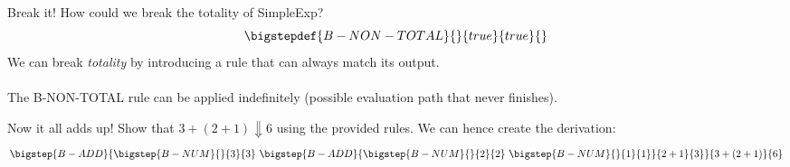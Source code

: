 \begin{examplebox}{Break it!}
    How could we break the totality of SimpleExp?
    \tcblower
    \[\bigstepdef{B-NON-TOTAL}{}{true}{true}{}\]
    We can break \textit{totality} by introducing a rule that can always match its output.
    \\ 
    \\ The B-NON-TOTAL rule can be applied indefinitely (possible evaluation path that never finishes).
\end{examplebox}

\begin{examplebox}{Now it all adds up!}
    Show that $3 + (2 + 1) \Downarrow 6$ using the provided rules.
    \tcblower
    We can hence create the derivation:
    \[\bigstep{B-ADD}{
        \bigstep{B-NUM}{}{3}{3} \ \bigstep{B-ADD}{
            \bigstep{B-NUM}{}{2}{2} \ \bigstep{B-NUM}{}{1}{1}
        }{2 + 1}{3}
    }{3 + (2 + 1)}{6}\] 
\end{examplebox}

